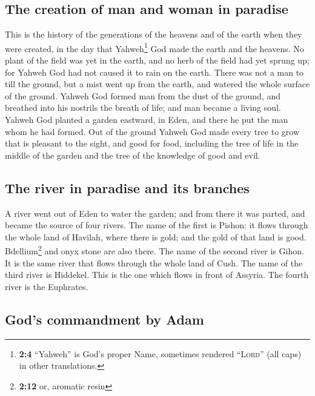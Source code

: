 \hypertarget{the-creation-of-man-and-woman-in-paradise}{%
\subsection{The creation of man and woman in
paradise}\label{the-creation-of-man-and-woman-in-paradise}}

 This is the history of the generations of the heavens and
of the earth when they were created, in the day that Yahweh\footnote{\textbf{2:4}
  ``Yahweh'' is God's proper Name, sometimes rendered ``\textsc{Lord}''
  (all caps) in other translations.} God made the earth and the heavens.
 No plant of the field was yet in the earth, and no herb
of the field had yet sprung up; for Yahweh God had not caused it to rain
on the earth. There was not a man to till the ground,  but
a mist went up from the earth, and watered the whole surface of the
ground.  Yahweh God formed man from the dust of the
ground, and breathed into his nostrils the breath of life; and man
became a living soul.  Yahweh God planted a garden
eastward, in Eden, and there he put the man whom he had formed.
 Out of the ground Yahweh God made every tree to grow that
is pleasant to the sight, and good for food, including the tree of life
in the middle of the garden and the tree of the knowledge of good and
evil.

\hypertarget{the-river-in-paradise-and-its-branches}{%
\subsection{The river in paradise and its
branches}\label{the-river-in-paradise-and-its-branches}}

 A river went out of Eden to water the garden; and from
there it was parted, and became the source of four rivers.
 The name of the first is Pishon: it flows through the
whole land of Havilah, where there is gold;  and the gold
of that land is good. Bdellium\footnote{\textbf{2:12} or, aromatic resin}
and onyx stone are also there.  The name of the second
river is Gihon. It is the same river that flows through the whole land
of Cush.  The name of the third river is Hiddekel. This
is the one which flows in front of Assyria. The fourth river is the
Euphrates.

\hypertarget{gods-commandment-by-adam}{%
\subsection{God's commandment by Adam}\label{gods-commandment-by-adam}}

